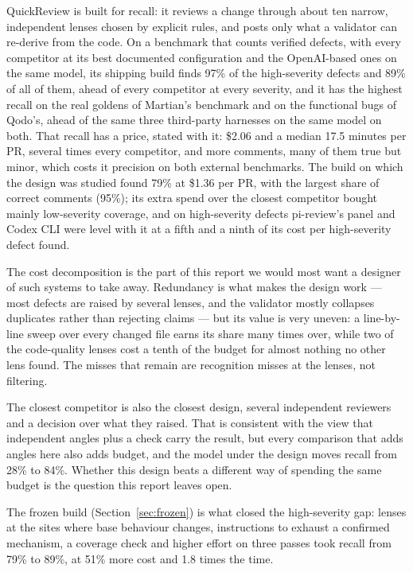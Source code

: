 \documentclass[11pt,a4paper]{article}
\newcommand{\qcr}{QuickReview}
\begin{document}
\qcr{} is built for recall: it reviews a change through about ten narrow,
independent lenses chosen by explicit rules, and posts only what a validator
can re-derive from the code. On a benchmark that counts verified defects,
with every competitor at its best documented configuration and the
OpenAI-based ones on the same model, its shipping build finds 97\% of the
high-severity defects and 89\% of all of them, ahead of every competitor at
every severity, and it has the highest recall on the real goldens of
Martian's benchmark and on the functional bugs of Qodo's, ahead of the same
three third-party harnesses on the same model on both. That recall has a
price, stated with it: \$2.06 and a median 17.5 minutes per PR, several
times every competitor, and more comments, many of them true but minor,
which costs it precision on both external benchmarks. The build on which
the design was studied found 79\% at \$1.36 per PR, with the largest share
of correct comments (95\%); its extra spend over the closest competitor
bought mainly low-severity coverage, and on high-severity defects
pi-review's panel and Codex CLI were level with it at a fifth and a ninth of
its cost per high-severity defect found.

The cost decomposition is the part of this report we would most want a
designer of such systems to take away. Redundancy is what makes the design
work --- most defects are raised by several lenses, and the validator mostly
collapses duplicates rather than rejecting claims --- but its value is very
uneven: a line-by-line sweep over every changed file earns its share many
times over, while two of the code-quality lenses cost a tenth of the budget
for almost nothing no other lens found. The misses that remain are
recognition misses at the lenses, not filtering.

The closest competitor is also the closest design, several independent
reviewers and a decision over what they raised. That is consistent with the
view that independent angles plus a check carry the result, but every
comparison that adds angles here also adds budget, and the model under the
design moves recall from 28\% to 84\%. Whether this design beats a
different way of spending the same budget is the question this report
leaves open.

The frozen build (Section~\ref{sec:frozen}) is what closed the
high-severity gap: lenses at the sites where base behaviour changes,
instructions to exhaust a confirmed mechanism, a coverage check and higher
effort on three passes took recall from 79\% to 89\%, at 51\% more cost and
1.8 times the time.
\end{document}

